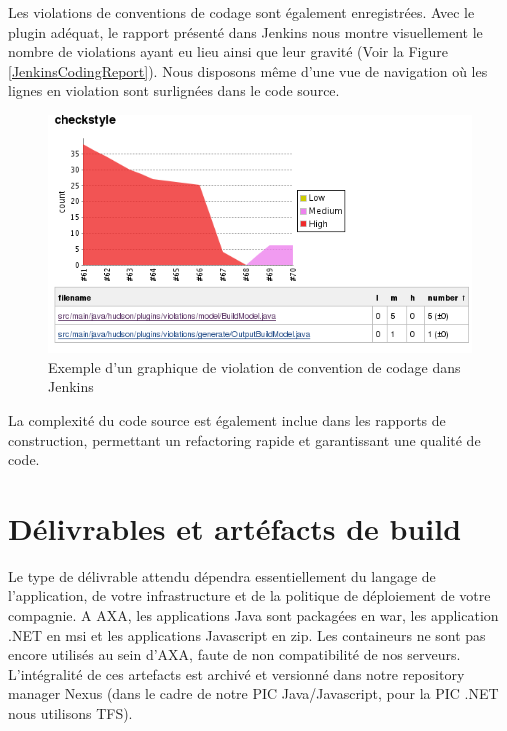    Les violations de conventions de codage sont également enregistrées. Avec le plugin adéquat, le rapport présenté dans Jenkins nous montre visuellement le nombre de violations ayant eu lieu ainsi que leur gravité (Voir la Figure \ref{JenkinsCodingReport}). Nous disposons même d'une vue de navigation où les lignes en violation sont surlignées dans le code source.\\

    \begin{figure}
      \begin{center}
        \includegraphics[scale=0.7]{images/JenkinsCodingReport.png}
      \end{center}
      \caption{Exemple d'un graphique de violation de convention de codage dans Jenkins}
      \label{JenkinsTestReport}
    \end{figure}

    La complexité du code source est également inclue dans les rapports de construction, permettant un refactoring rapide et garantissant une qualité de code.

  \section{Délivrables et artéfacts de build}
  Le type de délivrable attendu dépendra essentiellement du langage de l'application, de votre infrastructure et de la politique de déploiement de votre compagnie. A AXA, les applications Java sont packagées en war, les application .NET en msi et les applications Javascript en zip. Les containeurs ne sont pas encore utilisés au sein d'AXA, faute de non compatibilité de nos serveurs. L'intégralité de ces artefacts est archivé et versionné dans notre repository manager Nexus (dans le cadre de notre PIC Java/Javascript, pour la PIC .NET nous utilisons TFS).\\


